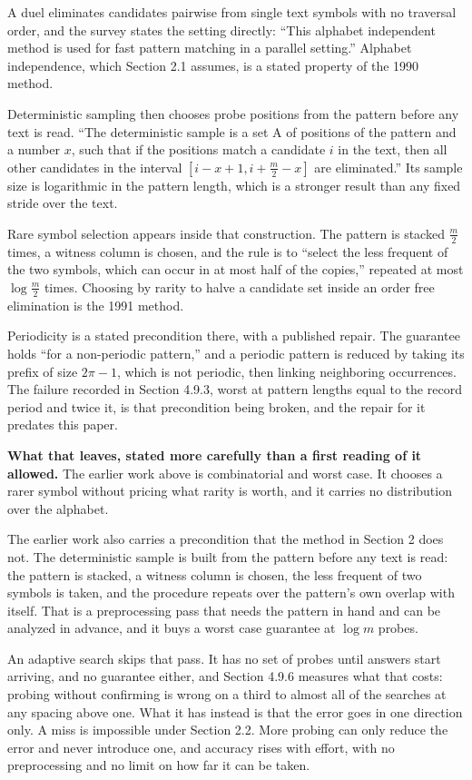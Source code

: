 A duel eliminates candidates pairwise from single text symbols with no traversal order, and the survey states the setting directly: ``This alphabet independent method is used for fast pattern matching in a parallel setting.'' Alphabet independence, which Section 2.1 assumes, is a stated property of the 1990 method.

Deterministic sampling then chooses probe positions from the pattern before any text is read. ``The deterministic sample is a set A of positions of the pattern and a number \(x\), such that if the positions match a candidate \(i\) in the text, then all other candidates in the interval \([i-x+1, i+\tfrac{m}{2}-x]\) are eliminated.'' Its sample size is logarithmic in the pattern length, which is a stronger result than any fixed stride over the text.

Rare symbol selection appears inside that construction. The pattern is stacked \(\tfrac{m}{2}\) times, a witness column is chosen, and the rule is to ``select the less frequent of the two symbols, which can occur in at most half of the copies,'' repeated at most \(\log \tfrac{m}{2}\) times. Choosing by rarity to halve a candidate set inside an order free elimination is the 1991 method.

Periodicity is a stated precondition there, with a published repair. The guarantee holds ``for a non-periodic pattern,'' and a periodic pattern is reduced by taking its prefix of size \(2\pi-1\), which is not periodic, then linking neighboring occurrences. The failure recorded in Section 4.9.3, worst at pattern lengths equal to the record period and twice it, is that precondition being broken, and the repair for it predates this paper.

\noindent\textbf{What that leaves, stated more carefully than a first reading of it allowed.} The earlier work above is combinatorial and worst case. It chooses a rarer symbol without pricing what rarity is worth, and it carries no distribution over the alphabet.

The earlier work also carries a precondition that the method in Section 2 does not. The deterministic sample is built from the pattern before any text is read: the pattern is stacked, a witness column is chosen, the less frequent of two symbols is taken, and the procedure repeats over the pattern's own overlap with itself. That is a preprocessing pass that needs the pattern in hand and can be analyzed in advance, and it buys a worst case guarantee at \(\log m\) probes.

An adaptive search skips that pass. It has no set of probes until answers start arriving, and no guarantee either, and Section 4.9.6 measures what that costs: probing without confirming is wrong on a third to almost all of the searches at any spacing above one. What it has instead is that the error goes in one direction only. A miss is impossible under Section 2.2. More probing can only reduce the error and never introduce one, and accuracy rises with effort, with no preprocessing and no limit on how far it can be taken.

